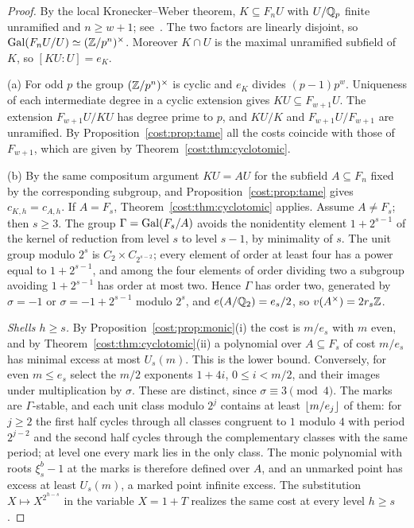 \begin{proof}
By the local Kronecker--Weber theorem, $K\subseteq F_nU$ with $U/\mathbb{Q}_p$ finite unramified
and $n\ge w+1$; see~\cite[Lecture~20]{Sutherland2017Number}. The two factors are linearly
disjoint, so $\operatorname{Gal}(F_nU/U)\simeq(\mathbb{Z}/p^n)^\times$. Moreover $K\cap U$ is the maximal
unramified subfield of $K$, so $[KU:U]=e_K$.

(a) For odd $p$ the group $(\mathbb{Z}/p^n)^\times$ is cyclic and $e_K$ divides $(p-1)p^w$.
Uniqueness of each intermediate degree in a cyclic extension gives
$KU\subseteq F_{w+1}U$. The extension $F_{w+1}U/KU$ has degree prime to $p$, and $KU/K$ and
$F_{w+1}U/F_{w+1}$ are unramified. By Proposition~\ref{cost:prop:tame} all the costs coincide with
those of $F_{w+1}$, which are given by Theorem~\ref{cost:thm:cyclotomic}.

(b) By the same compositum argument $KU=AU$ for the subfield $A\subseteq F_n$ fixed by the
corresponding subgroup, and Proposition~\ref{cost:prop:tame} gives $c_{K,h}=c_{A,h}$. If $A=F_s$,
Theorem~\ref{cost:thm:cyclotomic} applies. Assume $A\ne F_s$; then $s\ge3$. The group
$\Gamma=\operatorname{Gal}(F_s/A)$ avoids the nonidentity element $1+2^{s-1}$ of the kernel of reduction
from level $s$ to level $s-1$, by minimality of $s$. The unit group modulo $2^s$ is
$C_2\times C_{2^{s-2}}$; every element of order at least four has a power equal to
$1+2^{s-1}$, and among the four elements of order dividing two a subgroup avoiding
$1+2^{s-1}$ has order at most two. Hence $\Gamma$ has order two, generated by $\sigma=-1$ or
$\sigma=-1+2^{s-1}$ modulo $2^s$, and $e(A/\mathbb{Q}_2)=e_s/2$, so $v(A^\times)=2r_s\mathbb{Z}$.

\emph{Shells $h\ge s$.} By Proposition~\ref{cost:prop:monic}(i) the cost is $m/e_s$ with $m$ even, and
by Theorem~\ref{cost:thm:cyclotomic}(ii) a polynomial over $A\subseteq F_s$ of cost $m/e_s$ has
minimal excess at most $U_s(m)$. This is the lower bound. Conversely, for even $m\le e_s$
select the $m/2$ exponents $1+4i$, $0\le i<m/2$, and their images under multiplication by
$\sigma$. These are distinct, since $\sigma\equiv3\pmod4$. The marks are $\Gamma$-stable, and
each unit class modulo $2^j$ contains at least $\lfloor m/e_j\rfloor$ of them: for $j\ge2$ the
first half cycles through all classes congruent to $1$ modulo $4$ with period $2^{j-2}$ and
the second half cycles through the complementary classes with the same period; at level one
every mark lies in the only class. The monic polynomial with roots $\xi_s^b-1$ at the
marks is therefore defined over $A$, and an unmarked point has excess at least $U_s(m)$, a
marked point infinite excess. The substitution $X\mapsto X^{2^{h-s}}$ in the variable
$X=1+T$ realizes the same cost at every level $h\ge s$.


\end{proof}
